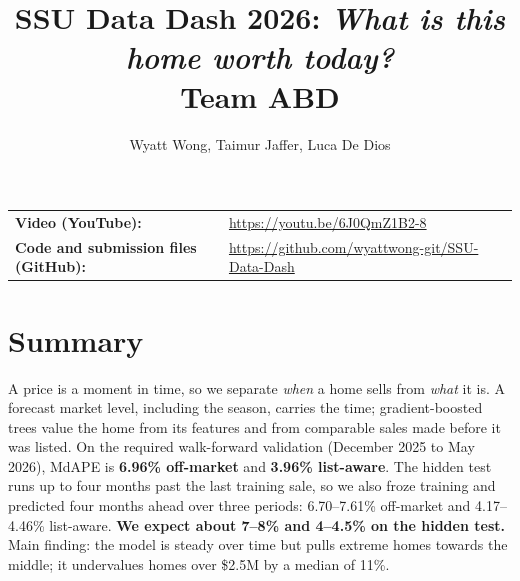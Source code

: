 \documentclass[11pt]{article}
\title{SSU Data Dash 2026: \textit{What is this home worth today?}\\[2pt]\large Team ABD}
\author{Wyatt Wong, Taimur Jaffer, Luca De Dios}
\date{}
\begin{document}
\maketitle

\noindent\begin{tabular}{@{}ll}
\textbf{Video (YouTube):} & \url{https://youtu.be/6J0QmZ1B2-8} \\
\textbf{Code and submission files (GitHub):} & \url{https://github.com/wyattwong-git/SSU-Data-Dash} \\
\end{tabular}

\section*{Summary}
A price is a moment in time, so we separate \emph{when} a home sells from \emph{what} it is. A forecast market level, including the season, carries the time; gradient-boosted trees value the home from its features and from comparable sales made before it was listed. On the required walk-forward validation (December 2025 to May 2026), MdAPE is \textbf{6.96\% off-market} and \textbf{3.96\% list-aware}. The hidden test runs up to four months past the last training sale, so we also froze training and predicted four months ahead over three periods: 6.70--7.61\% off-market and 4.17--4.46\% list-aware. \textbf{We expect about 7--8\% and 4--4.5\% on the hidden test.} Main finding: the model is steady over time but pulls extreme homes towards the middle; it undervalues homes over \$2.5M by a median of 11\%.
\end{document}
